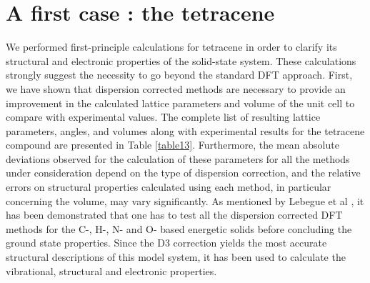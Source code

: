 \section{A first case : the tetracene}

We performed first-principle calculations for tetracene in order to clarify its structural and electronic properties of the solid-state system. These calculations strongly suggest the necessity to go beyond the standard DFT approach. First, we have shown that dispersion corrected methods are necessary to provide an improvement in the calculated lattice parameters and volume of the unit cell to compare with experimental values. The complete list of resulting lattice parameters, angles, and volumes along with experimental results for the tetracene compound are presented in Table \ref{table13}. Furthermore, the mean absolute deviations observed for the calculation of these parameters for all the methods under consideration depend on the type of dispersion correction, and the relative errors on structural properties calculated using each method, in particular concerning the volume, may vary significantly. As mentioned by Lebegue et al \cite{appalakondaiah2015dispersion}, it has been demonstrated that one has to test all the dispersion corrected DFT methods for the C-, H-, N- and O- based energetic solids before concluding the ground state properties. Since the D3 correction yields the most accurate structural descriptions of this model system, it has been used to calculate the vibrational, structural and electronic properties.\\
 
